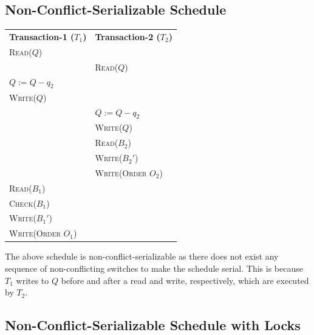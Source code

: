 \documentclass[12pt]{report}
\begin{document}
    \pagebreak
    \subsection*{Non-Conflict-Serializable Schedule}

    \begin{center}
        \begin{adjustbox}{width=\textwidth}
            \begin{tabularx}{\textwidth}{|X|X|}
            \hline
            \multirow{2}{*}{\textbf{Transaction-1 ($T_{1}$)}} & \multirow{2}{*}{\textbf{Transaction-2 ($T_{2}$)}} \\
            & \\ \hline
            \textsc{Read($Q$)} & \\
            & \textsc{Read($Q$)} \\
            \textsc{$Q := Q - q_{2}$} & \\
            \textsc{Write($Q$)} & \\
            & \textsc{$Q := Q - q_{2}$} \\
            & \textsc{Write($Q$)} \\
            & \textsc{Read($B_{2}$)} \\
            & \textsc{Write($B_{2}'$)} \\
            & \textsc{Write(Order $O_{2}$)} \\
            \textsc{Read($B_{1}$)} & \\
            \textsc{Check($B_{1}$)} & \\
            \textsc{Write($B_{1}'$)} & \\
            \textsc{Write(Order $O_{1}$)} & \\
            \hline
            \end{tabularx}
        \end{adjustbox}
    \end{center}
    \vspace*{10pt}
    The above schedule is non-conflict-serializable as there does not exist any sequence of non-conflicting switches
    to make the schedule serial. This is because $T_{1}$ writes to $Q$ before and after a read and write,
    respectively, which are executed by $T_{2}$.

    \pagebreak
    \subsection*{Non-Conflict-Serializable Schedule with Locks}
\end{document}
